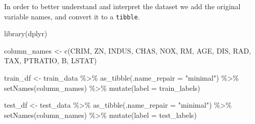 \documentclass[
  12pt,
]{style/krantz}
\newenvironment{Shaded}{\begin{snugshade}}{\end{snugshade}}
\newcommand{\AttributeTok}[1]{\textcolor[rgb]{0.77,0.63,0.00}{#1}}
\newcommand{\CommentTok}[1]{\textcolor[rgb]{0.56,0.35,0.01}{\textit{#1}}}
\newcommand{\FunctionTok}[1]{\textcolor[rgb]{0.00,0.00,0.00}{#1}}
\newcommand{\NormalTok}[1]{#1}
\newcommand{\OtherTok}[1]{\textcolor[rgb]{0.56,0.35,0.01}{#1}}
\newcommand{\SpecialCharTok}[1]{\textcolor[rgb]{0.00,0.00,0.00}{#1}}
\newcommand{\StringTok}[1]{\textcolor[rgb]{0.31,0.60,0.02}{#1}}
\begin{document}
\begin{Shaded}
\end{Shaded}

In order to better understand and interpret the dataset we add the original variable names, and convert it to a \texttt{tibble}.

\begin{Shaded}
\begin{Highlighting}[]
\FunctionTok{library}\NormalTok{(dplyr)}

\NormalTok{column\_names }\OtherTok{\textless{}{-}} \FunctionTok{c}\NormalTok{(}\StringTok{\textquotesingle{}CRIM\textquotesingle{}}\NormalTok{, }\StringTok{\textquotesingle{}ZN\textquotesingle{}}\NormalTok{, }\StringTok{\textquotesingle{}INDUS\textquotesingle{}}\NormalTok{, }\StringTok{\textquotesingle{}CHAS\textquotesingle{}}\NormalTok{, }\StringTok{\textquotesingle{}NOX\textquotesingle{}}\NormalTok{, }\StringTok{\textquotesingle{}RM\textquotesingle{}}\NormalTok{, }\StringTok{\textquotesingle{}AGE\textquotesingle{}}\NormalTok{, }
                  \StringTok{\textquotesingle{}DIS\textquotesingle{}}\NormalTok{, }\StringTok{\textquotesingle{}RAD\textquotesingle{}}\NormalTok{, }\StringTok{\textquotesingle{}TAX\textquotesingle{}}\NormalTok{, }\StringTok{\textquotesingle{}PTRATIO\textquotesingle{}}\NormalTok{, }\StringTok{\textquotesingle{}B\textquotesingle{}}\NormalTok{, }\StringTok{\textquotesingle{}LSTAT\textquotesingle{}}\NormalTok{)}

\NormalTok{train\_df }\OtherTok{\textless{}{-}}\NormalTok{ train\_data }\SpecialCharTok{\%\textgreater{}\%} 
  \FunctionTok{as\_tibble}\NormalTok{(}\AttributeTok{.name\_repair =} \StringTok{"minimal"}\NormalTok{) }\SpecialCharTok{\%\textgreater{}\%} 
  \FunctionTok{setNames}\NormalTok{(column\_names) }\SpecialCharTok{\%\textgreater{}\%} 
  \FunctionTok{mutate}\NormalTok{(}\AttributeTok{label =}\NormalTok{ train\_labels)}

\NormalTok{test\_df }\OtherTok{\textless{}{-}}\NormalTok{ test\_data }\SpecialCharTok{\%\textgreater{}\%} 
  \FunctionTok{as\_tibble}\NormalTok{(}\AttributeTok{.name\_repair =} \StringTok{"minimal"}\NormalTok{) }\SpecialCharTok{\%\textgreater{}\%} 
  \FunctionTok{setNames}\NormalTok{(column\_names) }\SpecialCharTok{\%\textgreater{}\%} 
  \FunctionTok{mutate}\NormalTok{(}\AttributeTok{label =}\NormalTok{ test\_labels)}
\end{Highlighting}
\end{Shaded}
\end{document}
